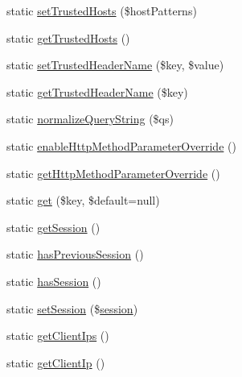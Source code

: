 \begin{DoxyCompactItemize}
static \mbox{\hyperlink{class_illuminate_1_1_support_1_1_facades_1_1_request_a0f4e03016975d5e78f6841b4b3b2d853}{set\+Trusted\+Hosts}} (\$host\+Patterns)
\item 
static \mbox{\hyperlink{class_illuminate_1_1_support_1_1_facades_1_1_request_a7af20f1cdde18bc998466e6b94613503}{get\+Trusted\+Hosts}} ()
\item 
static \mbox{\hyperlink{class_illuminate_1_1_support_1_1_facades_1_1_request_abbd0aa91652f2122be7a351876da3468}{set\+Trusted\+Header\+Name}} (\$key, \$value)
\item 
static \mbox{\hyperlink{class_illuminate_1_1_support_1_1_facades_1_1_request_a55370a6f7198b65ee1ab0f8416f4fb40}{get\+Trusted\+Header\+Name}} (\$key)
\item 
static \mbox{\hyperlink{class_illuminate_1_1_support_1_1_facades_1_1_request_a4e65d88d0e7c68e2b9aaafcfe83a91b5}{normalize\+Query\+String}} (\$qs)
\item 
static \mbox{\hyperlink{class_illuminate_1_1_support_1_1_facades_1_1_request_a39cf798202cb88125c454d7813767a01}{enable\+Http\+Method\+Parameter\+Override}} ()
\item 
static \mbox{\hyperlink{class_illuminate_1_1_support_1_1_facades_1_1_request_a6dc526d395a74c75de55eb597cbf66d5}{get\+Http\+Method\+Parameter\+Override}} ()
\item 
static \mbox{\hyperlink{class_illuminate_1_1_support_1_1_facades_1_1_request_af1519e8f3d8baaa19829f3f4a53c9b41}{get}} (\$key, \$default=null)
\item 
static \mbox{\hyperlink{class_illuminate_1_1_support_1_1_facades_1_1_request_a19c092888199ad4b1e3e5f254bc65698}{get\+Session}} ()
\item 
static \mbox{\hyperlink{class_illuminate_1_1_support_1_1_facades_1_1_request_a70640b694c1a135a6e196be88478c25f}{has\+Previous\+Session}} ()
\item 
static \mbox{\hyperlink{class_illuminate_1_1_support_1_1_facades_1_1_request_abdb40f9f98e0988e0d46701d84b08eaa}{has\+Session}} ()
\item 
static \mbox{\hyperlink{class_illuminate_1_1_support_1_1_facades_1_1_request_a89fade31642421bad06c770d5d3505fa}{set\+Session}} (\$\mbox{\hyperlink{class_illuminate_1_1_support_1_1_facades_1_1_request_a3b3b1c25368c2e40ecdb0830a53183a8}{session}})
\item 
static \mbox{\hyperlink{class_illuminate_1_1_support_1_1_facades_1_1_request_acff1ecb5fd2edd0194bfa8ab1c120bcd}{get\+Client\+Ips}} ()
\item 
static \mbox{\hyperlink{class_illuminate_1_1_support_1_1_facades_1_1_request_ac78e7218a697e138ce105a04d49f2ff7}{get\+Client\+Ip}} ()

\end{DoxyCompactItemize}
